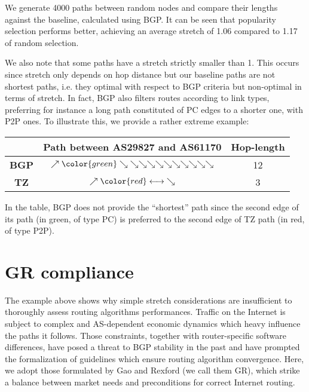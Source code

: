 \documentclass[a4paper,11pt,oneside]{report}
\begin{document}
We generate 4000 paths between random nodes and compare their lengths against the baseline, calculated using BGP. It can be seen that popularity selection performs better, achieving an average stretch of 1.06 compared to 1.17 of random selection.

We also note that some paths have a stretch strictly smaller than 1. This occurs since stretch only depends on hop distance but our baseline paths are not shortest paths, i.e. they optimal with respect to BGP criteria but non-optimal in terms of stretch. In fact, BGP also filters routes according to link types, preferring for instance a long path constituted of PC edges to a shorter one, with P2P ones. To illustrate this, we provide a rather extreme example:

\begin{center}
\begin{tabular}{c|c|c}
&Path between \textbf{AS29827} and \textbf{AS61170}&Hop-length \\
\hline
\textbf{BGP}& $\nearrow {\color{green}\searrow} \searrow \searrow \searrow \searrow \searrow \searrow \searrow \searrow \searrow \searrow$ & 12 \\
\textbf{TZ}& $\nearrow {\color{red}\longleftrightarrow} \searrow$ & 3
\end{tabular}
\end{center}

In the table, BGP does not provide the ``shortest'' path since the second edge of its path (in green, of type PC) is preferred to the second edge of TZ path (in red, of type P2P).

\section{GR compliance}
The example above shows why simple stretch considerations are insufficient to thoroughly assess routing algorithms performances. Traffic on the Internet is subject to complex and AS-dependent economic dynamics which heavy influence the paths it follows. Those constraints, together with router-specific software differences, have posed a threat to BGP stability in the past and have prompted the formalization of guidelines which ensure routing algorithm convergence. Here, we adopt those formulated by Gao and Rexford \cite{lixingaoStableInternetRouting2001} (we call them GR), which strike a balance between market needs and preconditions for correct Internet routing.
\end{document}
